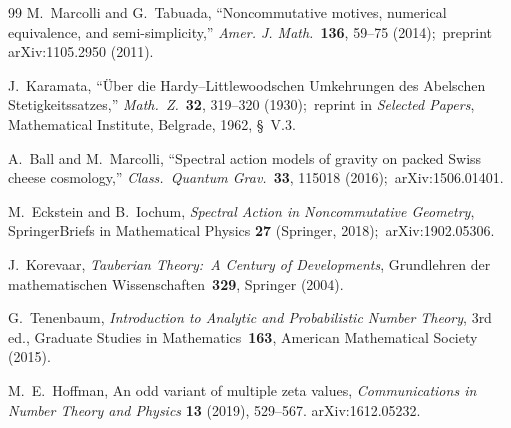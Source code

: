 \documentclass[11pt,a4paper]{article}
\theoremstyle{plain}
\theoremstyle{definition}
\begin{document}
\begin{thebibliography}{99}
M.~Marcolli and G.~Tabuada, ``Noncommutative motives, numerical
equivalence, and semi-simplicity,''
\textit{Amer. J. Math.}~\textbf{136}, 59--75 (2014);\ preprint
arXiv:1105.2950 (2011).

J.~Karamata, ``\"Uber die Hardy--Littlewoodschen Umkehrungen des
Abelschen Stetigkeitssatzes,'' \textit{Math.\ Z.}~\textbf{32},
319--320 (1930);\ reprint in \textit{Selected Papers},
Mathematical Institute, Belgrade, 1962, \S~V.3.

A.~Ball and M.~Marcolli, ``Spectral action models of gravity on packed Swiss cheese
cosmology,'' \textit{Class.\ Quantum Grav.}\ \textbf{33}, 115018 (2016);\ arXiv:1506.01401.

M.~Eckstein and B.~Iochum, \textit{Spectral Action in Noncommutative Geometry},
SpringerBriefs in Mathematical Physics \textbf{27} (Springer, 2018);\ arXiv:1902.05306.

J.~Korevaar, \textit{Tauberian Theory:\ A Century of Developments},
Grundlehren der mathematischen Wissenschaften~\textbf{329}, Springer
(2004).

G.~Tenenbaum, \textit{Introduction to Analytic and Probabilistic
Number Theory}, 3rd ed., Graduate Studies in Mathematics~\textbf{163},
American Mathematical Society (2015).

M.~E.~Hoffman, An odd variant of multiple zeta values,
\textit{Communications in Number Theory and Physics} \textbf{13}
(2019), 529--567. arXiv:1612.05232.

\end{thebibliography}
\end{document}
